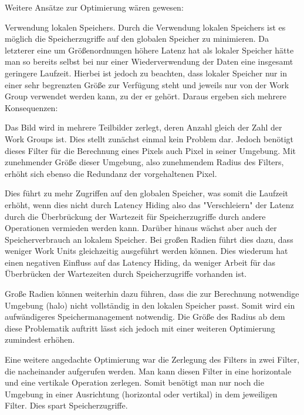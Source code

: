 \documentclass[10pt,a4paper]{article}
\begin{document}
Weitere Ansätze zur Optimierung wären gewesen:

Verwendung lokalen Speichers. Durch die Verwendung lokalen Speichers ist es möglich die Speicherzugriffe auf den globalen Speicher zu minimieren. Da letzterer eine um Größenordnungen höhere Latenz hat als lokaler Speicher hätte man so bereits selbst bei nur einer Wiederverwendung der Daten eine insgesamt geringere Laufzeit. Hierbei ist jedoch zu beachten, dass lokaler Speicher nur in einer sehr begrenzten Größe zur Verfügung steht und jeweils nur von der Work Group verwendet werden kann, zu der er gehört. Daraus ergeben sich mehrere Konsequenzen:

Das Bild wird in mehrere Teilbilder zerlegt, deren Anzahl gleich der Zahl der Work Groups ist. Dies stellt zunächst einmal kein Problem dar. Jedoch benötigt dieses Filter für die Berechnung eines Pixels auch Pixel in seiner Umgebung. Mit zunehmender Größe dieser Umgebung, also zunehmendem Radius des Filters, erhöht sich ebenso die Redundanz der vorgehaltenen Pixel.


Dies führt zu mehr Zugriffen auf den globalen Speicher, was somit die Laufzeit erhöht, wenn dies nicht durch Latency Hiding also das "Verschleiern" der Latenz durch die Überbrückung der Wartezeit für Speicherzugriffe durch andere Operationen vermieden werden kann.
Darüber hinaus wächst aber auch der Speicherverbrauch an lokalem Speicher. Bei großen Radien führt dies dazu, dass weniger Work Units gleichzeitig ausgeführt werden können. Dies wiederum hat einen negativen Einfluss auf das Latency Hiding, da weniger Arbeit für das Überbrücken der Wartezeiten durch Speicherzugriffe vorhanden ist. 



Große Radien können weiterhin dazu führen, dass die zur Berechnung notwendige Umgebung (halo) nicht vollständig in den lokalen Speicher passt. Somit wird ein aufwändigeres Speichermanagement notwendig. Die Größe des Radius ab dem diese Problematik auftritt lässt sich jedoch mit einer weiteren Optimierung zumindest erhöhen.


Eine weitere angedachte Optimierung war die Zerlegung des Filters in zwei Filter, die nacheinander aufgerufen werden. Man kann diesen Filter in eine horizontale und eine vertikale Operation zerlegen. Somit benötigt man nur noch die Umgebung in einer Ausrichtung (horizontal oder vertikal) in dem jeweiligen Filter. Dies spart Speicherzugriffe.

\end{document}
